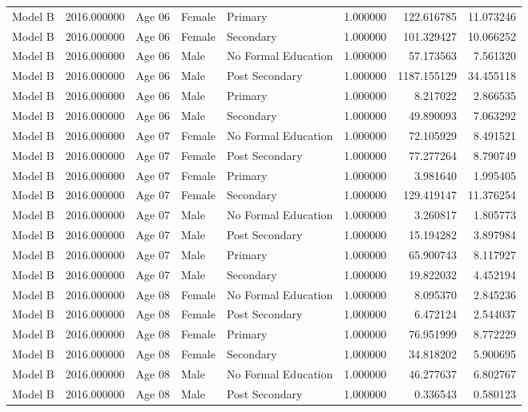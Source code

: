 \begin{table}[ht]
\begin{tabular}{lrlllrrr}
Model B & 2016.000000 & Age 06 & Female & Primary & 1.000000 & 122.616785 & 11.073246 \\
Model B & 2016.000000 & Age 06 & Female & Secondary & 1.000000 & 101.329427 & 10.066252 \\
Model B & 2016.000000 & Age 06 & Male & No Formal Education & 1.000000 & 57.173563 & 7.561320 \\
Model B & 2016.000000 & Age 06 & Male & Post Secondary & 1.000000 & 1187.155129 & 34.455118 \\
Model B & 2016.000000 & Age 06 & Male & Primary & 1.000000 & 8.217022 & 2.866535 \\
Model B & 2016.000000 & Age 06 & Male & Secondary & 1.000000 & 49.890093 & 7.063292 \\
Model B & 2016.000000 & Age 07 & Female & No Formal Education & 1.000000 & 72.105929 & 8.491521 \\
Model B & 2016.000000 & Age 07 & Female & Post Secondary & 1.000000 & 77.277264 & 8.790749 \\
Model B & 2016.000000 & Age 07 & Female & Primary & 1.000000 & 3.981640 & 1.995405 \\
Model B & 2016.000000 & Age 07 & Female & Secondary & 1.000000 & 129.419147 & 11.376254 \\
Model B & 2016.000000 & Age 07 & Male & No Formal Education & 1.000000 & 3.260817 & 1.805773 \\
Model B & 2016.000000 & Age 07 & Male & Post Secondary & 1.000000 & 15.194282 & 3.897984 \\
Model B & 2016.000000 & Age 07 & Male & Primary & 1.000000 & 65.900743 & 8.117927 \\
Model B & 2016.000000 & Age 07 & Male & Secondary & 1.000000 & 19.822032 & 4.452194 \\
Model B & 2016.000000 & Age 08 & Female & No Formal Education & 1.000000 & 8.095370 & 2.845236 \\
Model B & 2016.000000 & Age 08 & Female & Post Secondary & 1.000000 & 6.472124 & 2.544037 \\
Model B & 2016.000000 & Age 08 & Female & Primary & 1.000000 & 76.951999 & 8.772229 \\
Model B & 2016.000000 & Age 08 & Female & Secondary & 1.000000 & 34.818202 & 5.900695 \\
Model B & 2016.000000 & Age 08 & Male & No Formal Education & 1.000000 & 46.277637 & 6.802767 \\
Model B & 2016.000000 & Age 08 & Male & Post Secondary & 1.000000 & 0.336543 & 0.580123 \\

\end{tabular}
\end{table}
